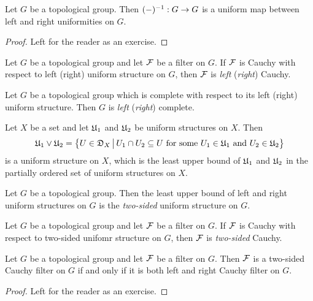 \documentclass[10pt]{amsart}
\begin{document}
\begin{fact}\label{fact:inverse_is_an_isomorphism_of_left_and_right_uniform_structures}
	Let $G$ be a topological group. Then $(-)^{-1}:G\rightarrow G$ is a uniform map between left and right uniformities on $G$.
\end{fact}
\begin{proof}
	Left for the reader as an exercise.
\end{proof}

\begin{definition}
	Let $G$ be a topological group and let ${\mathcal F}$ be a filter on $G$. If ${\mathcal F}$ is Cauchy with respect to left (right) uniform structure on $G$, then ${\mathcal F}$ is \textit{left} (\textit{right}) Cauchy.
\end{definition}

\begin{definition}
	Let $G$ be a topological group which is complete with respect to its left (right) uniform structure. Then $G$ is \textit{left} (\textit{right}) complete.
\end{definition}

\begin{remark}\label{remark:join_of_uniform_structures}
	Let $X$ be a set and let ${\mathfrak U}_1$ and ${\mathfrak U}_2$ be uniform structures on $X$. Then
	$${\mathfrak U}_1\vee {\mathfrak U}_2 = \big\{U \in {\mathfrak D}_X\,\big|\,U_1\cap U_2\subseteq U\mbox{ for some }U_1\in {\mathfrak U}_1\mbox{ and }U_2\in {\mathfrak U}_2\big\}$$
is a uniform structure on $X$, which is the least upper bound of ${\mathfrak U}_1$ and ${\mathfrak U}_2$ in the partially ordered set of uniform structures on $X$.
\end{remark}

\begin{definition}
	Let $G$ be a topological group. Then the least upper bound of left and right uniform structures on $G$ is the \textit{two-sided} uniform structure on $G$.
\end{definition}

\begin{definition}
	Let $G$ be a topological group and let ${\mathcal F}$ be a filter on $G$. If ${\mathcal F}$ is Cauchy with respect to two-sided unifomr structure on $G$, then ${\mathcal F}$ is \textit{two-sided} Cauchy.
\end{definition}

\begin{fact}\label{fact:two_sided_Cauchy_filters}
	Let $G$ be a topological group and let ${\mathcal F}$ be a filter on $G$. Then ${\mathcal F}$ is a two-sided Cauchy filter on $G$ if and only if it is both left and right Cauchy filter on $G$.
\end{fact}
\begin{proof}
	Left for the reader as an exercise.
\end{proof}
\end{document}
